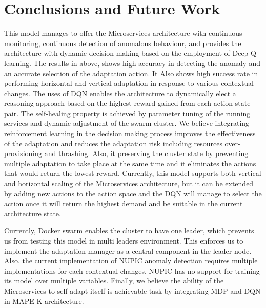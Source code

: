 \documentclass{ieeeaccess}
\begin{document}
\section{Conclusions and Future Work}\label{sec:Conclusion}
This model manages to offer the Microservices architecture with continuous monitoring, continuous detection of anomalous behaviour, and provides the architecture with dynamic decision making based on the employment of Deep Q-learning. The results in above, shows high accuracy in detecting the anomaly and an accurate selection of the adaptation action. It Also shows high success rate in performing horizontal and vertical adaptation in response to various contextual changes. The uses of DQN enables the architecture to dynamically elect a reasoning approach based on the highest reward gained from each action state pair. The self-healing property is achieved by parameter tuning of the running services and dynamic adjustment of the swarm cluster. We believe integrating reinforcement learning in the decision making process improves the effectiveness of the adaptation and reduces the adaptation risk including resources over-provisioning and thrashing. Also, it preserving the cluster state by preventing multiple adaptation to take place at the same time and it eliminates the actions that would return the lowest reward. Currently, this model supports both vertical and horizontal scaling of the Microservices architecture, but it can be extended by adding new actions to the action space and the DQN will manage to select the action once it will return the highest demand and be suitable in the current architecture state.  

Currently, Docker swarm enables the cluster to have one leader, which prevents us from testing this model in multi leaders environment. This enforces us to implement the adaptation manager as a central component in the leader node. Also, the current implementation of NUPIC anomaly detection requires multiple implementations for each contextual changes. NUPIC has no support for training its model over multiple variables. Finally, we believe the ability of the Microservices to self-adapt itself is achievable task by integrating MDP and DQN in MAPE-K architecture.
  
  

 
\newpage

 \EOD
\end{document}
